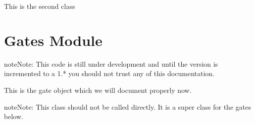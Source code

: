 \documentclass[letterpaper,10pt,english]{sphinxmanual}
\begin{document}

\begin{fulllineitems}
\label{\detokenize{index:example.Example2}}
\pysigstartsignatures
{}
\pysigstopsignatures
\sphinxAtStartPar
This is the second class

\end{fulllineitems}


\chapter{Gates Module}
\label{\detokenize{index:gates-module}}\label{\detokenize{index:module-gates}}
\begin{sphinxadmonition}{note}{Note:}
\sphinxAtStartPar
This code is still under development and until the version 
is incremented to a 1.* you should not trust any of this 
documentation.
\end{sphinxadmonition}

\begin{fulllineitems}
\label{\detokenize{index:gates.Gate}}
\pysigstartsignatures
{}
\pysigstopsignatures
\sphinxAtStartPar
This is the gate object which we will document properly now.

\begin{sphinxadmonition}{note}{Note:}
\sphinxAtStartPar
This class should not be called directly. It is a super
class for the gates below.
\end{sphinxadmonition}

\end{fulllineitems}

\end{document}
